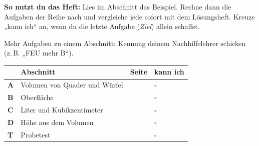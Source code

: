 \documentclass[11pt]{article}
\begin{document}
\par\smallskip
{}\par\medskip
\noindent\textbf{So nutzt du das Heft:} Lies im Abschnitt das Beispiel. Rechne dann die Aufgaben der Reihe nach und vergleiche jede sofort mit dem Lösungsheft. Kreuze „kann ich“ an, wenn du die letzte Aufgabe (\emph{Ziel}) allein schaffst.\par
\noindent Mehr Aufgaben zu einem Abschnitt: Kennung deinem Nachhilfelehrer schicken (z.\,B. „FEU mehr B“).\par\medskip
{\renewcommand{\arraystretch}{1.3}
\noindent\begin{tabular}{|>{\bfseries}p{10mm}|p{112mm}|>{\raggedleft\arraybackslash}p{10mm}|>{\centering\arraybackslash}p{14mm}|}\hline
\rowcolor{black!8} & \textbf{Abschnitt} & \textbf{Seite} & \textbf{kann ich}\\\hline
A & Volumen von Quader und Würfel & \pageref{s:A} & $\square$\\\hline
B & Oberfläche & \pageref{s:B} & $\square$\\\hline
C & Liter und Kubikzentimeter & \pageref{s:C} & $\square$\\\hline
D & Höhe aus dem Volumen & \pageref{s:D} & $\square$\\\hline
T & Probetest & \pageref{s:T} & $\square$\\\hline
\end{tabular}}\par\bigskip
\end{document}
